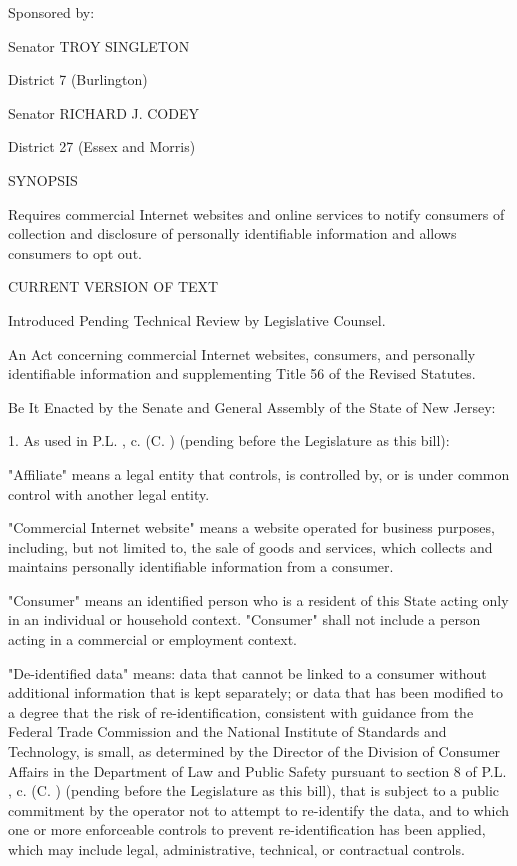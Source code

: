 Sponsored by:

Senator  TROY SINGLETON

District 7 (Burlington)

Senator  RICHARD J. CODEY

District 27 (Essex and Morris)

 

 

 

 

SYNOPSIS

     Requires commercial Internet websites and online services to notify consumers of collection and disclosure of personally identifiable information and allows consumers to opt out.

 

CURRENT VERSION OF TEXT

     Introduced Pending Technical Review by Legislative Counsel.

  


An Act concerning commercial Internet websites, consumers, and personally identifiable information and supplementing Title 56 of the Revised Statutes.

 

     Be It Enacted by the Senate and General Assembly of the State of New Jersey:

 

      1.   As used in P.L.    , c.    (C.      ) (pending before the Legislature as this bill):

      "Affiliate" means a legal entity that controls, is controlled by, or is under common control with another legal entity.

     "Commercial Internet website" means a website operated for business purposes, including, but not limited to, the sale of goods and services, which collects and maintains personally identifiable information from a consumer.

     "Consumer" means an identified person who is a resident of this State acting only in an individual or household context. "Consumer" shall not include a person acting in a commercial or employment context.

     "De-identified data" means: data that cannot be linked to a consumer without additional information that is kept separately; or data that has been modified to a degree that the risk of re-identification, consistent with guidance from the Federal Trade Commission and the National Institute of Standards and Technology, is small, as determined by the Director of the Division of Consumer Affairs in the Department of Law and Public Safety pursuant to section 8 of P.L.    , c.    (C.      ) (pending before the Legislature as this bill), that is subject to a public commitment by the operator not to attempt to re-identify the data, and to which one or more enforceable controls to prevent re-identification has been applied, which may include legal, administrative, technical, or contractual controls.


